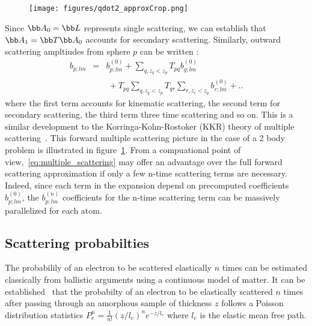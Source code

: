 \begin{figure}[h!]
  \centering
  \texttt{[image: figures/qdot2\_approxCrop.png]}
\label{fig:qdot2_approx}
\end{figure}


Since $\bb A_0=\bb L$ represents single scattering, we can establish that
$\bb A_1=\bb T\bb A_0$ accounts for secondary scattering.
Similarly, outward scattering ampltiudes from sphere $p$ can be written :
%
\begin{eqnarray}
  b_{p;lm} &=&
      b_{p;lm}^{(0)} + \sum_{q,z_q<z_p}T_{pq}b_{q;lm}^{(0)}  \label{eq:multiple_scattering}\\
    &&~+T_{pq}\sum_{q,z_q<z_p}T_{qr}\sum_{r,z_r<z_q}b_{r;lm}^{(0)} + ..\nonumber
\end{eqnarray}
%
where the first term accounts for kinematic scattering, the second term for
secondary scattering, the third term three time scattering and so on.
This is a similar development to the Korringa-Kohn-Rostoker (KKR) theory of
multiple scattering~\cite{Korringa1947,Kohn1954,Korringa1994}.
This forward multiple scattering picture in the case of a 2 body problem is
illustrated in figure~\ref{fig:qdot2_approx}.
From a compuational point of view,~\eqref{eq:multiple_scattering} may offer an
advantage over the full forward scattering approximation if only a few n-time
scattering terms are necessary. Indeed, since each term in the expansion depend
on precomputed coefficients $b_{p;lm}^{(0)}$, the $b_{p;lm}^{(n)}$ coefficients
for the n-time scattering term can be massively parallelized for each atom.


\subsection{Scattering probabilties}

The probabilily of an electron to be scattered elastically $n$ times can be
estimated classically from ballistic arguments using a continuous model of matter.
It can be established~\cite{Egerton2011d} that the probabilty of an electron to
be elastically scattered $n$ times after passing through an amorphous sample of
thickness $z$ follows a Poisson distribution statistics
$P_e^n=\frac{1}{n!}(z/l_e)^ne^{-z/l_e}$
where $l_e$ is the elastic mean free path.

